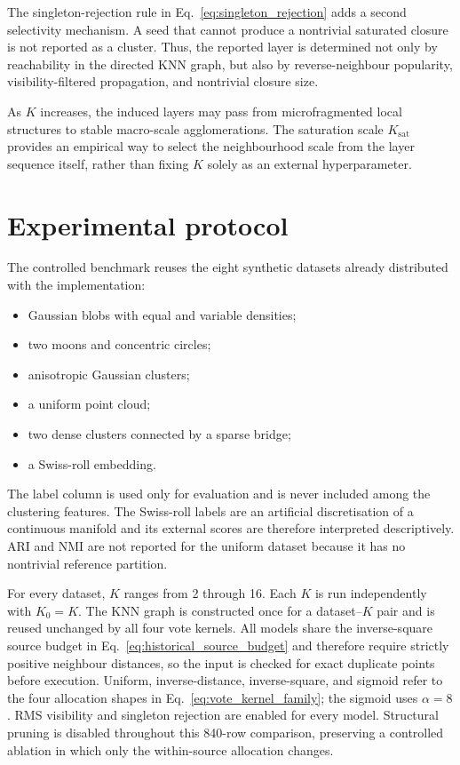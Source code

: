 \documentclass[pdflatex,sn-mathphys-num]{sn-jnl}
\begin{document}
The singleton-rejection rule in Eq.~\eqref{eq:singleton_rejection} adds a second selectivity mechanism. A seed that cannot produce a nontrivial saturated closure is not reported as a cluster. Thus, the reported layer is determined not only by reachability in the directed KNN graph, but also by reverse-neighbour popularity, visibility-filtered propagation, and nontrivial closure size.

As $K$ increases, the induced layers may pass from microfragmented local structures to stable macro-scale agglomerations. The saturation scale $K_{\mathrm{sat}}$ provides an empirical way to select the neighbourhood scale from the layer sequence itself, rather than fixing $K$ solely as an external hyperparameter.

\section{Experimental protocol}\label{sec:experimental_protocol}

The controlled benchmark reuses the eight synthetic datasets already distributed with the implementation:
\begin{itemize}
    \item Gaussian blobs with equal and variable densities;
    \item two moons and concentric circles;
    \item anisotropic Gaussian clusters;
    \item a uniform point cloud;
    \item two dense clusters connected by a sparse bridge;
    \item a Swiss-roll embedding.
\end{itemize}
The label column is used only for evaluation and is never included among the clustering features. The Swiss-roll labels are an artificial discretisation of a continuous manifold and its external scores are therefore interpreted descriptively. ARI and NMI are not reported for the uniform dataset because it has no nontrivial reference partition.

For every dataset, $K$ ranges from 2 through 16. Each $K$ is run independently with $K_0=K$. The KNN graph is constructed once for a dataset--$K$ pair and is reused unchanged by all four vote kernels. All models share the inverse-square source budget in Eq.~\eqref{eq:historical_source_budget} and therefore require strictly positive neighbour distances, so the input is checked for exact duplicate points before execution. Uniform, inverse-distance, inverse-square, and sigmoid refer to the four allocation shapes in Eq.~\eqref{eq:vote_kernel_family}; the sigmoid uses $\alpha=8$. RMS visibility and singleton rejection are enabled for every model. Structural pruning is disabled throughout this 840-row comparison, preserving a controlled ablation in which only the within-source allocation changes.
\end{document}
